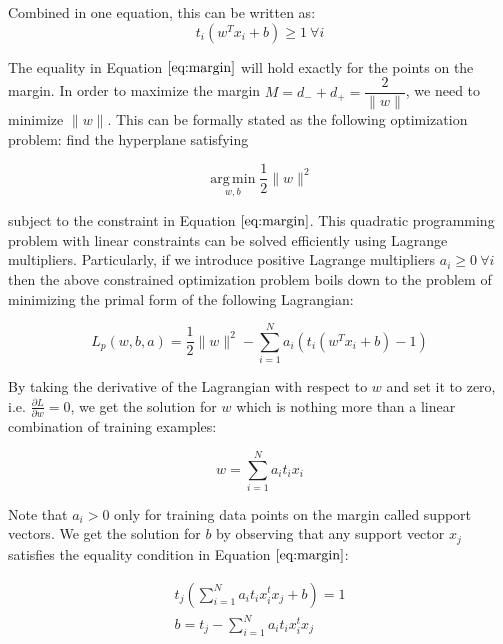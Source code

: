 \documentclass{SMBV12}
\begin{document}
Combined in one equation, this can be written as:
\begin{equation}
t_i(w^T x_i + b) \geq 1\ \forall i
\label{eq:margin}
\end{equation}

The equality in Equation $\ref{eq:margin}$ will hold exactly for the points on the margin. In order to maximize the margin $M = d_- + d_+ = \dfrac{2}{\|w\|}$, we need to minimize $\|w\|$. This can be formally stated as the following optimization problem: find the hyperplane satisfying

\begin{equation}
\operatorname*{arg\,min}_{w, b} \dfrac{1}{2}\|w\|^2
\end{equation}

subject to the constraint in Equation $\ref{eq:margin}$. This quadratic programming problem with linear constraints can be solved efficiently using Lagrange multipliers. Particularly, if we introduce positive Lagrange multipliers $a_i \geq 0\ \forall i$ then the above constrained optimization problem boils down to the problem of minimizing the primal form of the following Lagrangian:

\begin{equation}
L_p(w, b, a) = \dfrac{1}{2} \|w\|^2 - \sum\limits_{i = 1}^{N}a_i\left( t_i(w^T x_i + b) - 1 \right) 
\end{equation}

By taking the derivative of the Lagrangian with respect to $w$ and set it to zero, i.e. $\frac{\partial L}{\partial w} = 0$, we get the solution for $w$ which is nothing more than a linear combination of training examples:

\begin{equation}
w = \sum\limits_{i = 1}^{N} a_i t_i x_i
\end{equation}

Note that $a_i > 0$ only for training data points on the margin called support vectors. We get the solution for $b$ by observing that any support vector $x_j$ satisfies the equality condition in Equation $\ref{eq:margin}$:

\begin{equation}
\begin{array}{lcl}
t_j \left( \sum\limits_{i = 1}^{N} a_i t_i x_i^t x_j + b \right) = 1\\
b = t_j - \sum\limits_{i = 1}^{N} a_i t_i x_i^t x_j
\end{array}
\end{equation}
\end{document}
